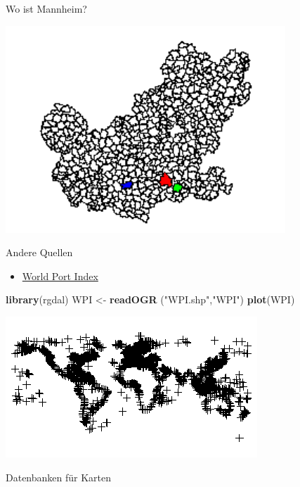 \documentclass[ignorenonframetext,]{beamer}
\newenvironment{Shaded}{\begin{snugshade}}{\end{snugshade}}
\newcommand{\KeywordTok}[1]{\textcolor[rgb]{0.13,0.29,0.53}{\textbf{#1}}}
\newcommand{\NormalTok}[1]{#1}
\newcommand{\StringTok}[1]{\textcolor[rgb]{0.31,0.60,0.02}{#1}}
\providecommand{\tightlist}{%
  \setlength{\itemsep}{0pt}\setlength{\parskip}{0pt}}
\begin{document}
\begin{frame}{Wo ist Mannheim?}
\protect\hypertarget{wo-ist-mannheim}{}

\includegraphics{figure/DreiStaedte.png}

\end{frame}

\begin{frame}[fragile]{Andere Quellen}
\protect\hypertarget{andere-quellen}{}

\begin{itemize}
\tightlist
\item
  \href{http://msi.nga.mil/NGAPortal/MSI.portal?_nfpb=true\&_pageLabel=msi_portal_page_62\&pubCode=0015}{World
  Port Index}
\end{itemize}

\begin{Shaded}
\begin{Highlighting}[]
\KeywordTok{library}\NormalTok{(rgdal)}
\NormalTok{WPI <-}\StringTok{ }\KeywordTok{readOGR}\NormalTok{ (}\StringTok{"WPI.shp"}\NormalTok{,}\StringTok{"WPI"}\NormalTok{)}
\KeywordTok{plot}\NormalTok{(WPI)}
\end{Highlighting}
\end{Shaded}

\includegraphics{figure/WPI.png}

Datenbanken für Karten

\end{frame}
\end{document}
